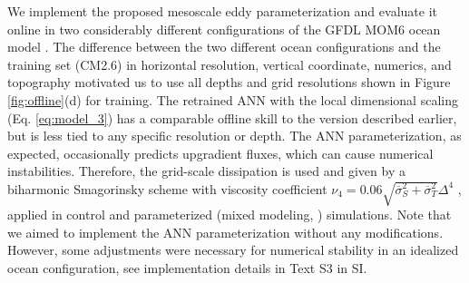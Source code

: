 \documentclass[draft]{agujournal2019}
\begin{document}
We implement the proposed mesoscale eddy parameterization and evaluate it online in two considerably different configurations of the GFDL MOM6 ocean model \cite{adcroft2019gfdl}. The difference between the two different ocean configurations and the training set (CM2.6) in horizontal resolution, vertical coordinate, numerics, and topography motivated us to use all depths and grid resolutions shown in Figure \ref{fig:offline}(d) for training. The retrained ANN with the local dimensional scaling (Eq. \eqref{eq:model_3}) has a comparable offline skill to the version described earlier, but is less tied to any specific resolution or depth. The ANN parameterization, as expected, occasionally predicts upgradient fluxes, which can cause numerical instabilities. Therefore, the grid-scale dissipation is used and given by a biharmonic Smagorinsky scheme with viscosity coefficient $\nu_4 = 0.06 \sqrt{\overline{\sigma}_S^2+\overline{\sigma}_T^2} \Delta^4$   \cite{adcroft2019gfdl}, applied in control and parameterized (mixed modeling, ) simulations. Note that we aimed to implement the ANN parameterization without any modifications. However, some adjustments were necessary for numerical stability in an idealized ocean configuration, see implementation details in Text S3 in SI. 


\end{document}
